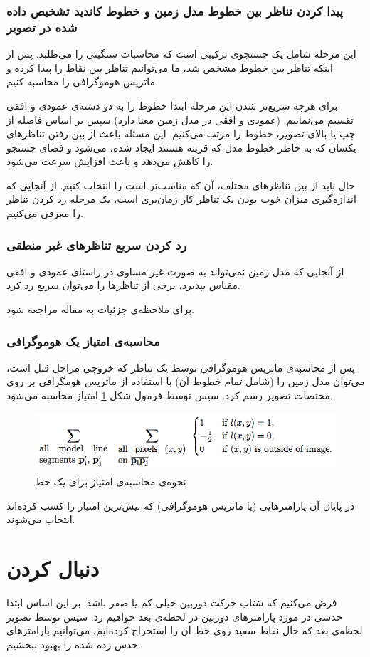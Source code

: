 \documentclass{report}
\begin{document}
\subsubsection{پیدا کردن تناظر بین خطوط مدل زمین و خطوط کاندید تشخیص داده شده در تصویر}
این مرحله شامل یک جستجوی ترکیبی است که محاسبات سنگینی را می‌طلبد. پس از اینکه تناظر بین خطوط مشخص شد، ما می‌توانیم تناظر بین نقاط را پیدا کرده و ماتریس هوموگرافی را محاسبه کنیم.

برای هرچه سریع‌تر شدن این مرحله ابتدا خطوط را به دو دسته‌ی عمودی و افقی تقسیم می‌نماییم. (عمودی و افقی در مدل زمین معنا دارد) سپس بر اساس فاصله از چپ یا بالای تصویر، خطوط را مرتب می‌کنیم. این مسئله باعث از بین رفتن تناظرهای یکسان که به خاطر خطوط مدل که قرینه هستند ایجاد شده، می‌شود و فضای جستجو را کاهش می‌دهد و باعث افزایش سرعت می‌شود.

حال باید از بین تناظرهای مختلف، آن که مناسب‌تر است را انتخاب کنیم. از آنجایی که اندازه‌گیری میزان خوب بودن یک تناظر کار زمان‌بری است، یک مرحله رد کردن تناظر را معرفی می‌کنیم.
\subsubsection{رد کردن سریع تناظرهای غیر منطقی}
از آنجایی که مدل زمین نمی‌تواند به صورت غیر مساوی در راستای عمودی و افقی مقیاس بپذیرد، برخی از تناظرها را می‌توان سریع رد کرد.

برای ملاحظه‌ی جزئیات به مقاله مراجعه شود.
\subsubsection{محاسبه‌ی امتیاز یک هوموگرافی}
پس از محاسبه‌ی ماتریس هوموگرافی توسط یک تناظر که خروجی مراحل قبل است، می‌توان مدل زمین را (شامل تمام خطوط آن) با استفاده از ماتریس هومگرافی بر روی مختصات تصویر رسم کرد. سپس توسط فرمول شکل \ref{score} امتیاز محاسبه می‌شود.

\begin{figure}
\centering
\includegraphics[scale=0.5]{score.png}
\caption{نحوه‌ی محاسبه‌ی امتیاز برای یک خط}
\label{score}
\end{figure}

در پایان آن پارامترهایی (یا ماتریس هوموگرافی) که بیش‌ترین امتیاز را کسب کرده‌اند انتخاب می‌شوند.
\section{دنبال کردن}
فرض می‌کنیم که شتاب حرکت دوربین خیلی کم یا صفر باشد. بر این اساس ابتدا حدسی در مورد پارامترهای دوربین در لحظه‌ی بعد خواهیم زد. سپس توسط تصویر لحظه‌ی بعد که حال نقاط سفید روی خط آن را استخراج کرده‌ایم، می‌توانیم پارامترهای حدس زده شده را بهبود ببخشیم.
\end{document}
